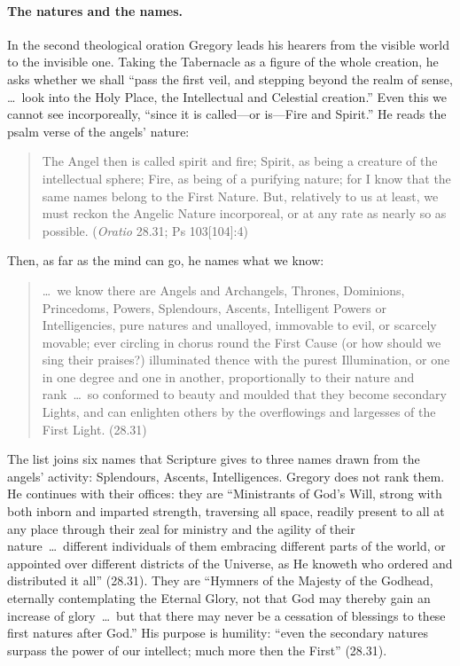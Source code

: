 \paragraph{The natures and the names.} In the second theological oration
Gregory leads his hearers from the visible world to the invisible one.
Taking the Tabernacle as a figure of the whole creation, he asks whether
we shall ``pass the first veil, and stepping beyond the realm of sense,
\dots\ look into the Holy Place, the Intellectual and Celestial
creation.'' Even this we cannot see incorporeally, ``since it is
called---or is---Fire and Spirit.'' He reads the psalm verse of the angels'
nature:

\begin{quote}
The Angel then is called spirit and fire; Spirit, as being a creature of
the intellectual sphere; Fire, as being of a purifying nature; for I know
that the same names belong to the First Nature. But, relatively to us at
least, we must reckon the Angelic Nature incorporeal, or at any rate as
nearly so as possible. (\emph{Oratio} 28.31; Ps 103[104]:4)
\end{quote}

\noindent Then, as far as the mind can go, he names what we know:

\begin{quote}
\dots\ we know there are Angels and Archangels, Thrones, Dominions,
Princedoms, Powers, Splendours, Ascents, Intelligent Powers or
Intelligencies, pure natures and unalloyed, immovable to evil, or
scarcely movable; ever circling in chorus round the First Cause (or how
should we sing their praises?) illuminated thence with the purest
Illumination, or one in one degree and one in another, proportionally to
their nature and rank~\dots\ so conformed to beauty and moulded that they
become secondary Lights, and can enlighten others by the overflowings
and largesses of the First Light. (28.31)
\end{quote}

\noindent The list joins six names that Scripture gives to three names drawn
from the angels' activity: Splendours,
Ascents, Intelligences. Gregory does not rank them. He continues with
their offices: they are ``Ministrants of God's Will, strong with both
inborn and imparted strength, traversing all space, readily present to
all at any place through their zeal for ministry and the agility of their
nature~\dots\ different individuals of them embracing different parts of
the world, or appointed over different districts of the Universe, as He
knoweth who ordered and distributed it all'' (28.31). They are ``Hymners
of the Majesty of the Godhead, eternally contemplating the Eternal
Glory, not that God may thereby gain an increase of glory~\dots\ but that
there may never be a cessation of blessings to these first natures after
God.'' His purpose is humility: ``even the secondary natures surpass the
power of our intellect; much more then the First'' (28.31).

